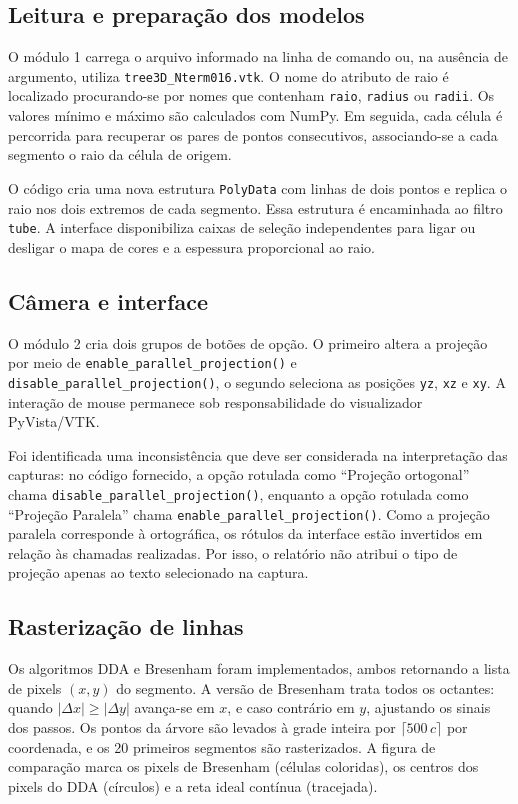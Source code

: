 \subsection{Leitura e preparação dos modelos}

O módulo 1 carrega o arquivo informado na linha de comando ou, na ausência de argumento, utiliza \texttt{tree3D\_Nterm016.vtk}. O nome do atributo de raio é localizado procurando-se por nomes que contenham \texttt{raio}, \texttt{radius} ou \texttt{radii}. Os valores mínimo e máximo são calculados com NumPy. Em seguida, cada célula é percorrida para recuperar os pares de pontos consecutivos, associando-se a cada segmento o raio da célula de origem.

O código cria uma nova estrutura \texttt{PolyData} com linhas de dois pontos e replica o raio nos dois extremos de cada segmento. Essa estrutura é encaminhada ao filtro \texttt{tube}. A interface disponibiliza caixas de seleção independentes para ligar ou desligar o mapa de cores e a espessura proporcional ao raio.

\subsection{Câmera e interface}

O módulo 2 cria dois grupos de botões de opção. O primeiro altera a projeção por meio de \texttt{enable\_parallel\_projection()} e \texttt{disable\_parallel\_projection()}, o segundo seleciona as posições \texttt{yz}, \texttt{xz} e \texttt{xy}. A interação de mouse permanece sob responsabilidade do visualizador PyVista/VTK.

Foi identificada uma inconsistência que deve ser considerada na interpretação das capturas: no código fornecido, a opção rotulada como ``Projeção ortogonal'' chama \texttt{disable\_parallel\_projection()}, enquanto a opção rotulada como ``Projeção Paralela'' chama \texttt{enable\_parallel\_projection()}. Como a projeção paralela corresponde à ortográfica, os rótulos da interface estão invertidos em relação às chamadas realizadas. Por isso, o relatório não atribui o tipo de projeção apenas ao texto selecionado na captura.


\subsection{Rasterização de linhas}
Os algoritmos DDA e Bresenham foram implementados, ambos retornando a lista de pixels $(x,y)$ do segmento. A versão de Bresenham trata todos os octantes: quando $|\Delta x|\ge|\Delta y|$ avança-se em $x$, e caso contrário em $y$, ajustando os sinais dos passos. Os pontos da árvore são levados à grade inteira por $\lceil 500\,c\rceil$ por coordenada, e os 20 primeiros segmentos são rasterizados. A figura de comparação marca os pixels de Bresenham (células coloridas), os centros dos pixels do DDA (círculos) e a reta ideal contínua (tracejada).

